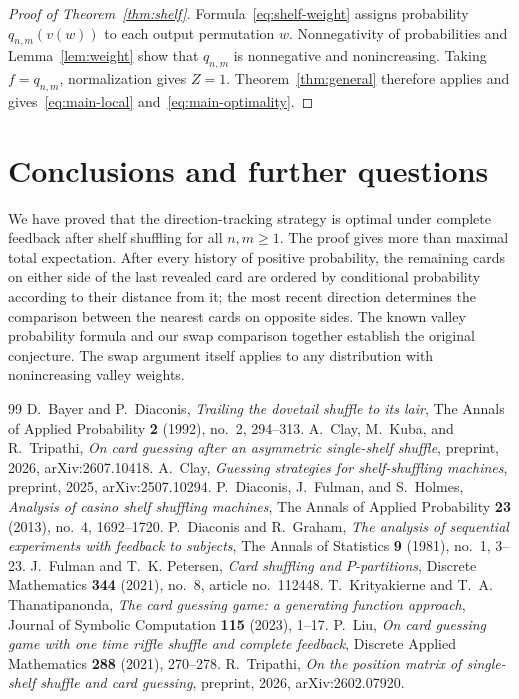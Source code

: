 \documentclass[10pt,a4paper]{amsart}
\numberwithin{equation}{section}
\begin{document}
\begin{proof}[Proof of Theorem~\ref{thm:shelf}]
Formula~\eqref{eq:shelf-weight} assigns probability $q_{n,m}(v(w))$ to each output permutation $w$. Nonnegativity of probabilities and Lemma~\ref{lem:weight} show that $q_{n,m}$ is nonnegative and nonincreasing. Taking $f=q_{n,m}$, normalization gives $Z=1$. Theorem~\ref{thm:general} therefore applies and gives~\eqref{eq:main-local} and~\eqref{eq:main-optimality}.
\end{proof}

\section{Conclusions and further questions}\label{sec:conclusion}
We have proved that the direction-tracking strategy is optimal under complete feedback after shelf shuffling for all $n,m\ge1$. The proof gives more than maximal total expectation. After every history of positive probability, the remaining cards on either side of the last revealed card are ordered by conditional probability according to their distance from it; the most recent direction determines the comparison between the nearest cards on opposite sides. The known valley probability formula and our swap comparison together establish the original conjecture. The swap argument itself applies to any distribution with nonincreasing valley weights.


\begin{thebibliography}{99}
 D.~Bayer and P.~Diaconis, \emph{{Trailing the dovetail shuffle to its lair}}, The Annals of Applied Probability \textbf{2} (1992), no.~2, 294--313.
 A.~Clay, M.~Kuba, and R.~Tripathi, \emph{{On card guessing after an asymmetric single-shelf shuffle}}, preprint, 2026, arXiv:2607.10418.
 A.~Clay, \emph{{Guessing strategies for shelf-shuffling machines}}, preprint, 2025, arXiv:2507.10294.
 P.~Diaconis, J.~Fulman, and S.~Holmes, \emph{{Analysis of casino shelf shuffling machines}}, The Annals of Applied Probability \textbf{23} (2013), no.~4, 1692--1720.
 P.~Diaconis and R.~Graham, \emph{{The analysis of sequential experiments with feedback to subjects}}, The Annals of Statistics \textbf{9} (1981), no.~1, 3--23.
 J.~Fulman and T.~K. Petersen, \emph{{Card shuffling and $P$-partitions}}, Discrete Mathematics \textbf{344} (2021), no.~8, article no.~112448.
 T.~Krityakierne and T.~A. Thanatipanonda, \emph{{The card guessing game: a generating function approach}}, Journal of Symbolic Computation \textbf{115} (2023), 1--17.
 P.~Liu, \emph{{On card guessing game with one time riffle shuffle and complete feedback}}, Discrete Applied Mathematics \textbf{288} (2021), 270--278.
 R.~Tripathi, \emph{{On the position matrix of single-shelf shuffle and card guessing}}, preprint, 2026, arXiv:2602.07920.
\end{thebibliography}
\end{document}
